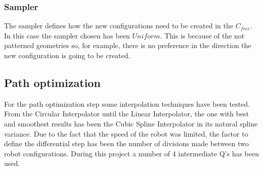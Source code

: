 	\subsubsection{Sampler} %
	\label{sub:sampler}
	The sampler defines how the new configurations need to be created in the $C_{free}$. In this case the sampler chosen has been $Uniform$. This is because of the not patterned geometries so, for example, there is no preference in the direction the new configuration is going to be created.
\subsection{Path optimization} %
\label{sub:path_optimization_implementation}
For the path optimization step some interpolation techniques have been tested. 
From the Circular Interpolator until the Linear Interpolator, the one with best and smoothest results has been the Cubic Spline Interpolator in its natural spline variance.
Due to the fact that the speed of the robot was limited, the factor to define the differential step has been the number of divisions made between two robot configurations. 
During this project a number of 4 intermediate Q's has been used.
